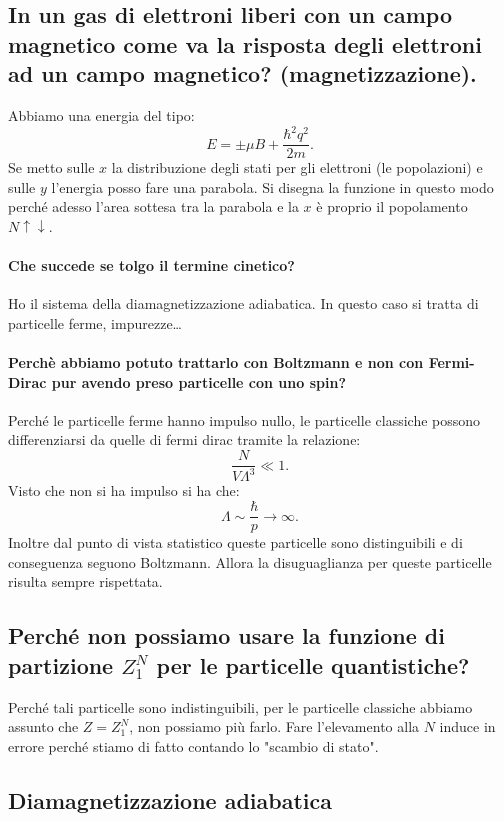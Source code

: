\subsection{In un gas di elettroni liberi con un campo magnetico come va la risposta degli elettroni ad un campo magnetico? (magnetizzazione).}%
\label{sub:In un gas di elettroni liberi con un campo magnetico come va la risposta degli elettroni ad un campo magnetico? (magnetizzazione).}
Abbiamo una energia del tipo:
\[
    E = \pm \mu  B + \frac{\hbar ^2q^2}{2m}
.\] 
Se metto sulle $x$ la distribuzione degli stati per gli elettroni (le popolazioni) e sulle $y$  l'energia posso fare una parabola. Si disegna la funzione in questo modo perché adesso l'area sottesa tra la parabola e la $x$  è proprio il popolamento $N\uparrow\downarrow$.
\paragraph{Che succede se tolgo il termine cinetico?}%
\label{par:Che succede se tolgo il termine cinetico?}
Ho il sistema della diamagnetizzazione adiabatica. In questo caso si tratta di particelle ferme, impurezze\ldots
\paragraph{Perchè abbiamo potuto trattarlo con Boltzmann e non con Fermi-Dirac pur avendo preso particelle con uno spin?}%
\label{par:Perchè abbiamo potuto trattarlo con Boltzmann e non con Fermi-Dirac pur avendo preso particelle con uno spin?}
Perché le particelle ferme hanno impulso nullo, le particelle classiche possono differenziarsi da quelle di fermi dirac tramite la relazione:
\[
    \frac{N}{V\Lambda^3}\ll 1
.\] 
Visto che non si ha impulso si ha che:
\[
    \Lambda  \sim \frac{\hbar }{p} \to \infty
.\] 
Inoltre dal punto di vista statistico queste particelle sono distinguibili e di conseguenza seguono Boltzmann.
Allora la disuguaglianza per queste particelle risulta sempre rispettata.
\subsection{Perché non possiamo usare la funzione di partizione $Z_1^N$  per le particelle quantistiche?}%
Perché tali particelle sono indistinguibili, per le particelle classiche abbiamo assunto che $Z = Z_1^N$, non possiamo più farlo. Fare l'elevamento alla $N$  induce in errore perché stiamo di fatto contando lo "scambio di stato". 
\subsection{Diamagnetizzazione adiabatica}%
